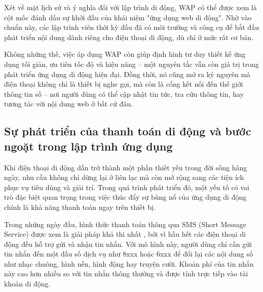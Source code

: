   \vspace{0.5em}
  
  \hspace*{0.8cm}Xét về mặt lịch sử và ý nghĩa đối với lập trình di động, WAP có thể được xem là cột mốc đánh dấu sự khởi đầu của khái niệm "ứng dụng web di động". Nhờ vào chuẩn này, các lập trình viên thời kỳ đầu đã có môi trường và công cụ để bắt đầu phát triển nội dung dành riêng cho điện thoại di động, dù chỉ ở mức rất cơ bản.
  
  \vspace{0.5em}
  
  \hspace*{0.8cm}Không những thế, việc áp dụng WAP còn giúp định hình tư duy thiết kế ứng dụng tối giản, ưu tiên tốc độ và hiệu năng – một nguyên tắc vẫn còn giá trị trong phát triển ứng dụng di động hiện đại. Đồng thời, nó cũng mở ra kỷ nguyên mà điện thoại không chỉ là thiết bị nghe gọi, mà còn là cổng kết nối đến thế giới thông tin số – nơi người dùng có thể cập nhật tin tức, tra cứu thông tin, hay tương tác với nội dung web ở bất cứ đâu.
  

\subsection{Sự phát triển của thanh toán di động và bước ngoặt trong lập trình ứng dụng}
\renewcommand{\labelitemi}{--}


\hspace*{0.8cm}Khi điện thoại di động dần trở thành một phần thiết yếu trong đời sống hàng ngày, nhu cầu không chỉ dừng lại ở liên lạc mà còn mở rộng sang các tiện ích phục vụ tiêu dùng và giải trí. Trong quá trình phát triển đó, một yếu tố có vai trò đặc biệt quan trọng trong việc thúc đẩy sự bùng nổ của ứng dụng di động chính là khả năng thanh toán ngay trên thiết bị.

\vspace{0.5em}

\hspace*{0.8cm}Trong những ngày đầu, hình thức thanh toán thông qua SMS (Short Message Service) được xem là giải pháp khả thi nhất \cite{sms-payment}, bởi vì hầu hết các điện thoại di động đều hỗ trợ gửi và nhận tin nhắn. Với mô hình này, người dùng chỉ cần gửi tin nhắn đến một đầu số dịch vụ như 8xxx hoặc 6xxx để đổi lại các nội dung số như nhạc chuông, hình nền, hình động hay truyện cười. Khoản phí của tin nhắn này cao hơn nhiều so với tin nhắn thông thường và được tính trực tiếp vào tài khoản di động.


